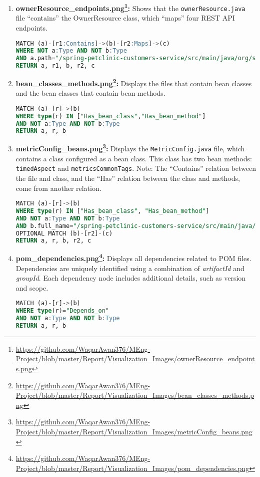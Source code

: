 \begin{enumerate}[before={\vspace{10pt}}, after={\vspace{10pt}}, itemsep=10pt, nosep, leftmargin=\parindent, labelindent=0pt]
\item \textbf{ownerResource\_endpoints.png\footnote{\url{https://github.com/WaqarAwan376/MEng-Project/blob/master/Report/Visualization_Images/ownerResource_endpoints.png}}:} Shows that the \texttt{ownerResource.java} file ``contains'' the OwnerResource class, which ``maps'' four REST API endpoints.
\begin{lstlisting}[language=SQL]
MATCH (a)-[r1:Contains]->(b)-[r2:Maps]->(c)
WHERE NOT a:Type AND NOT b:Type
AND a.path="/spring-petclinic-customers-service/src/main/java/org/springframework/samples/petclinic/customers/web/OwnerResource.java"
RETURN a, r1, b, r2, c
\end{lstlisting}
\vspace{10pt}

\item \textbf{bean\_classes\_methods.png\footnote{\url{https://github.com/WaqarAwan376/MEng-Project/blob/master/Report/Visualization_Images/bean_classes_methods.png}}:} Displays the files that contain bean classes and the bean classes that contain bean methods.
\begin{lstlisting}[language=SQL]
MATCH (a)-[r]->(b)
WHERE type(r) IN ["Has_bean_class","Has_bean_method"]
AND NOT a:Type AND NOT b:Type
RETURN a, r, b
\end{lstlisting}
\vspace{10pt}

\item \textbf{metricConfig\_beans.png\footnote{\url{https://github.com/WaqarAwan376/MEng-Project/blob/master/Report/Visualization_Images/metricConfig_beans.png}}:} Displays the \texttt{MetricConfig.java} file, which contains a class configured as a bean class. This class has two bean methods: \texttt{timedAspect} and \texttt{metricsCommonTags}. Note: The ``Contains'' relation between the file and class, and the ``Has'' relation between the class and methods, come from another relation.
\begin{lstlisting}[language=SQL]
MATCH (a)-[r]->(b)
WHERE type(r) IN ["Has_bean_class", "Has_bean_method"]
AND NOT a:Type AND NOT b:Type
AND b.full_name="/spring-petclinic-customers-service/src/main/java/org/springframework/samples/petclinic/customers/config/MetricConfig.java:MetricConfig"
OPTIONAL MATCH (b)-[r2]-(c)
RETURN a, r, b, r2, c
\end{lstlisting}
\vspace{10pt}

\item \textbf{pom\_dependencies.png\footnote{\url{https://github.com/WaqarAwan376/MEng-Project/blob/master/Report/Visualization_Images/pom_dependencies.png}}:} Displays all dependencies related to POM files. Dependencies are uniquely identified using a combination of \textit{artifactId} and \textit{groupId}. Each dependency node includes additional details, such as version and scope.
\begin{lstlisting}[language=SQL]
MATCH (a)-[r]->(b)
WHERE type(r)="Depends_on"
AND NOT a:Type AND NOT b:Type
RETURN a, r, b
\end{lstlisting}
\vspace{10pt}


\end{enumerate}
